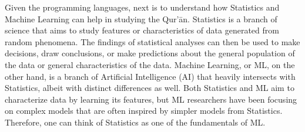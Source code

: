 Given the programming languages, next is to understand how Statistics and Machine Learning can help in studying the Qur'\=an. Statistics is a branch of science that aims to study features or characteristics of data generated from random phenomena. The findings of statistical analyses can then be used to make decisions, draw conclusions, or make predictions about the general population of the data or general characteristics of the data. Machine Learning, or ML, on the other hand, is a branch of Artificial Intelligence (AI) that heavily intersects with Statistics, albeit with distinct differences as well. Both Statistics and ML aim to characterize data by learning its features, but ML researchers have been focusing on complex models that are often inspired by simpler models from Statistics. Therefore, one can think of Statistics as one of the fundamentals of ML.


